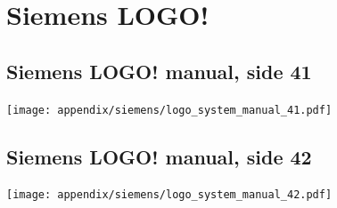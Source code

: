 \newpage
\section{Siemens LOGO!}

\subsection{Siemens LOGO! manual, side 41}
\label{man:logo_side_41}
\texttt{[image: appendix/siemens/logo\_system\_manual\_41.pdf]}

\subsection{Siemens LOGO! manual, side 42}
\label{man:logo_side_42}
\texttt{[image: appendix/siemens/logo\_system\_manual\_42.pdf]}

